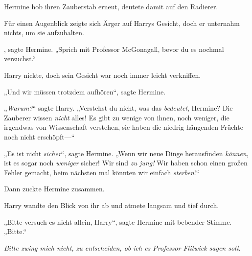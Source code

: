 Hermine hob ihren Zauberstab erneut, deutete damit auf den Radierer.

Für einen Augenblick zeigte sich Ärger auf Harrys Gesicht, doch er unternahm nichts, um sie aufzuhalten.

, sagte Hermine. „Sprich mit Professor McGonagall, bevor du es nochmal versuchst.“

Harry nickte, doch sein Gesicht war noch immer leicht verkniffen.

„Und wir müssen trotzdem aufhören“, sagte Hermine.

„\emph{Warum?}“ sagte Harry. „Verstehst du nicht, was das \emph{bedeutet}, Hermine? Die Zauberer wissen \emph{nicht} alles! Es gibt zu wenige von ihnen, noch weniger, die irgendwas von Wissenschaft verstehen, sie haben die niedrig hängenden Früchte noch nicht erschöpft—“

„Es ist nicht \emph{sicher}“, sagte Hermine. „Wenn wir neue Dinge herausfinden \emph{können}, ist es sogar noch \emph{weniger} sicher! Wir sind \emph{zu jung!} Wir haben schon einen großen Fehler gemacht, beim nächsten mal könnten wir einfach \emph{sterben}!“

Dann zuckte Hermine zusammen.

Harry wandte den Blick von ihr ab und atmete langsam und tief durch.

„Bitte versuch es nicht allein, Harry“, sagte Hermine mit bebender Stimme. „Bitte.“

\emph{Bitte zwing mich nicht, zu entscheiden, ob ich es Professor Flitwick sagen soll.}

